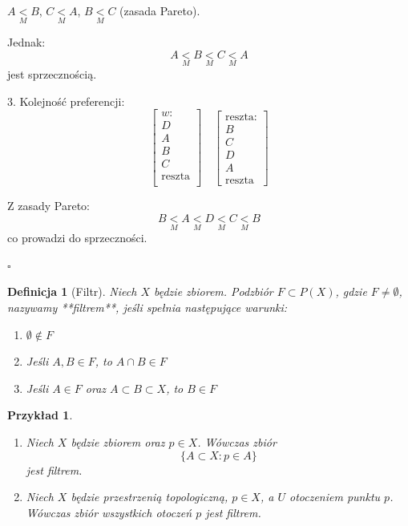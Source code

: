 \documentclass[12pt,a4paper]{article}
\theoremstyle{break}
\newtheorem{definition}{Definicja}[section]
\newtheorem{example}{Przykład}[section]
\begin{document}
	
	
	
	$A \underset{M}{<} B$, $C \underset{M}{<} A$, $B \underset{M}{<} C$ (zasada Pareto).  
	
	Jednak:
	\[
	A \underset{M}{<} B \underset{M}{<} C \underset{M}{<} A
	\]
	jest sprzecznością.
	
	3. Kolejność preferencji:
	\[
	\begin{bmatrix}
		w:\\
		D\\
		A\\
		B\\
		C\\
		\text{reszta}\\
	\end{bmatrix}
	\quad
	\begin{bmatrix}
		\text{reszta:}\\
		B\\
		C\\
		D\\
		A\\
		\text{reszta}
	\end{bmatrix}
	\]
	
	Z zasady Pareto:
	\[
	B \underset{M}{<} A \underset{M}{<} D \underset{M}{<} C \underset{M}{<} B
	\]
	co prowadzi do sprzeczności.		
	\begin{flushright}$\square$\end{flushright}
			\begin{definition}[Filtr]
				Niech $X$ będzie zbiorem. Podzbiór $F \subset P(X)$, gdzie $F \neq \emptyset$, nazywamy **filtrem**, jeśli spełnia następujące warunki:
				\begin{enumerate}[1)]
					\item $\emptyset \notin F$
					\item Jeśli $A, B \in F$, to $A \cap B \in F$
					\item Jeśli $A \in F$ oraz $A \subset B \subset X$, to $B \in F$
				\end{enumerate}
			\end{definition}
			
			\begin{example}
				\begin{enumerate}[1.]
					\item Niech $X$ będzie zbiorem oraz $p \in X$. Wówczas zbiór
					\[
					\{A \subset X : p \in A \}
					\]
					jest filtrem.
					\item Niech $X$ będzie przestrzenią topologiczną, $p \in X$, a $U$ otoczeniem punktu $p$. Wówczas zbiór wszystkich otoczeń $p$ jest filtrem.
				\end{enumerate}
			\end{example}
			
\end{document}
